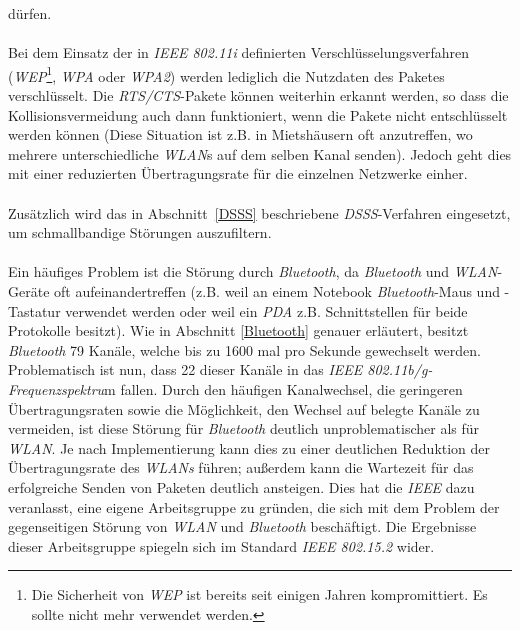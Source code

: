            dürfen.\\
            \\
            Bei dem Einsatz der in \emph{IEEE 802.11i} definierten Verschlüsselungsverfahren
            (\emph{WEP}\footnote{Die Sicherheit von \emph{WEP} ist bereits seit einigen Jahren
             kompromittiert. Es sollte nicht mehr verwendet werden.}, \emph{WPA} oder \emph{WPA2}) werden 
            lediglich die Nutzdaten des Paketes verschlüsselt. Die \emph{RTS/CTS}-Pakete können
            weiterhin erkannt werden, so dass die Kollisionsvermeidung auch dann
            funktioniert, wenn die Pakete nicht entschlüsselt werden können (Diese 
            Situation ist z.B. in Mietshäusern oft anzutreffen, wo mehrere 
            unterschiedliche \emph{WLAN}s auf dem selben Kanal senden). Jedoch geht dies
            mit einer reduzierten Übertragungsrate für die einzelnen Netzwerke
            einher.\\
            \\
            Zusätzlich wird das in Abschnitt~\ref{DSSS} beschriebene \emph{DSSS}-Verfahren
            eingesetzt, um schmallbandige Störungen auszufiltern. \\
            \\
            Ein häufiges Problem ist die Störung durch \emph{Bluetooth}, da 
            \emph{Bluetooth} und \emph{WLAN}-Geräte oft aufeinandertreffen (z.B. weil an einem
            Notebook \emph{Bluetooth}-Maus und -Tastatur verwendet werden oder weil 
            ein \emph{PDA} z.B. Schnittstellen für beide Protokolle besitzt).
            Wie in Abschnitt \ref{Bluetooth} genauer erläutert, besitzt \emph{Bluetooth}
            79 Kanäle, welche bis zu 1600 mal pro Sekunde gewechselt werden.
            Problematisch ist nun, dass 22 dieser Kanäle in das 
            \emph{IEEE 802.11b/g-Frequenzspektru}m fallen. Durch den häufigen
            Kanalwechsel, die geringeren Übertragungsraten sowie die 
            Möglichkeit, den Wechsel auf belegte Kanäle zu vermeiden, ist diese
            Störung für \emph{Bluetooth} deutlich unproblematischer als für \emph{WLAN}.
            Je nach Implementierung kann dies zu einer deutlichen Reduktion
            der Übertragungsrate des \emph{WLANs} führen; außerdem kann die Wartezeit
            für das erfolgreiche Senden von Paketen deutlich ansteigen.
            Dies hat die \emph{IEEE} dazu veranlasst, eine eigene Arbeitsgruppe
            zu gründen, die sich mit dem Problem der gegenseitigen Störung
            von \emph{WLAN} und \emph{Bluetooth} beschäftigt. Die Ergebnisse dieser
            Arbeitsgruppe spiegeln sich im Standard \emph{IEEE 802.15.2} wider.

